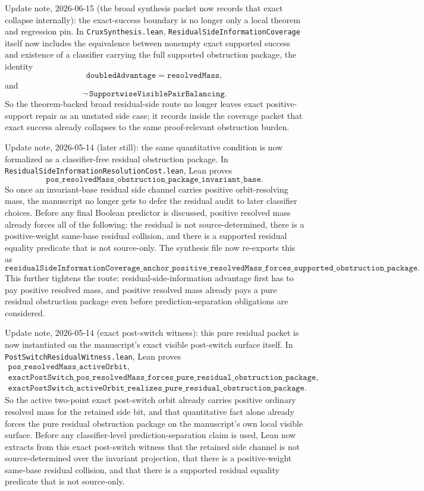 \documentclass[11pt]{article}
\theoremstyle{remark}
\begin{document}
Update note, 2026-06-15 (the broad synthesis packet now records that exact
collapse internally): the exact-success boundary is no longer only a local
theorem and regression pin.  In \texttt{CruxSynthesis.lean},
\texttt{ResidualSideInformationCoverage} itself now includes the equivalence
between nonempty exact supported success and existence of a classifier
carrying the full supported obstruction package, the identity
\[
\texttt{doubledAdvantage} = \texttt{resolvedMass},
\]
and
\[
\neg\,\texttt{SupportwiseVisiblePairBalancing}.
\]
So the theorem-backed broad residual-side route no longer leaves exact
positive-support repair as an unstated side case; it records inside the
coverage packet that exact success already collapses to the same
proof-relevant obstruction burden.

Update note, 2026-05-14 (later still): the same quantitative condition is now
formalized as a classifier-free residual obstruction package.  In
\texttt{ResidualSideInformationResolutionCost.lean}, Lean proves
\[
\texttt{pos\_resolvedMass\_obstruction\_package\_invariant\_base}.
\]
So once an invariant-base residual side channel carries positive
orbit-resolving mass, the manuscript no longer gets to defer the residual audit
to later classifier choices.  Before any final Boolean predictor is discussed,
positive resolved mass already forces all of the following: the residual is not
source-determined, there is a positive-weight same-base residual collision, and
there is a supported residual equality predicate that is not source-only.  The
synthesis file now re-exports this as
\[
\texttt{residualSideInformationCoverage\_anchor\_positive\_resolvedMass\_forces\_supported\_obstruction\_package}.
\]
This further tightens the route: residual-side-information advantage first has
to pay positive resolved mass, and positive resolved mass already pays a pure
residual obstruction package even before prediction-separation obligations are
considered.

Update note, 2026-05-14 (exact post-switch witness): this pure residual packet
is now instantiated on the manuscript's exact visible post-switch surface
itself.  In \texttt{PostSwitchResidualWitness.lean}, Lean proves
\[
\begin{gathered}
\texttt{pos\_resolvedMass\_activeOrbit},\\
\texttt{exactPostSwitch\_pos\_resolvedMass\_forces\_pure\_residual\_obstruction\_package},\\
\texttt{exactPostSwitch\_activeOrbit\_realizes\_pure\_residual\_obstruction\_package}.
\end{gathered}
\]
So the active two-point exact post-switch orbit already carries positive
ordinary resolved mass for the retained side bit, and that quantitative fact
alone already forces the pure residual obstruction package on the manuscript's
own local visible surface.  Before any classifier-level prediction-separation
claim is used, Lean now extracts from this exact post-switch witness that the
retained side channel is not source-determined over the invariant projection,
that there is a positive-weight same-base residual collision, and that there is
a supported residual equality predicate that is not source-only.
\end{document}

